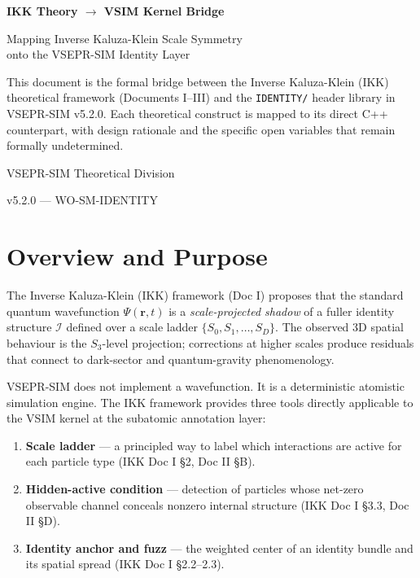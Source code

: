 \documentclass[11pt, a4paper, oneside]{article}
\newcommand{\Id}{\mathcal{I}}
\theoremstyle{definition}
\theoremstyle{remark}
\begin{document}
\begin{titlepage}
  \centering
  \vspace*{1.5cm}
  {\Huge\bfseries IKK Theory $\to$ VSIM Kernel Bridge\par}
  \vspace{0.8cm}
  {\Large Mapping Inverse Kaluza-Klein Scale Symmetry\\[0.3em]
  onto the VSEPR-SIM Identity Layer\par}
  \vspace{1.5cm}
  {\normalsize
	This document is the formal bridge between the Inverse Kaluza-Klein (IKK)
	theoretical framework (Documents I--III) and the \texttt{IDENTITY/} header
	library in VSEPR-SIM v5.2.0.  Each theoretical construct is mapped to its
	direct C++ counterpart, with design rationale and the specific open variables
	that remain formally undetermined.
  \par}
  \vspace{1.5cm}
  {\large VSEPR-SIM Theoretical Division\par}
  \vspace{0.3cm}
  {\large v5.2.0 --- WO-SM-IDENTITY\par}
\end{titlepage}

\tableofcontents
\newpage

\section{Overview and Purpose}

The Inverse Kaluza-Klein (IKK) framework (Doc I) proposes that the standard
quantum wavefunction $\Psi(\mathbf{r}, t)$ is a \emph{scale-projected shadow}
of a fuller identity structure $\Id$ defined over a scale ladder
$\{S_0, S_1, \ldots, S_D\}$.  The observed 3D spatial behaviour is the
$S_3$-level projection; corrections at higher scales produce residuals that
connect to dark-sector and quantum-gravity phenomenology.

VSEPR-SIM does not implement a wavefunction.  It is a deterministic atomistic
simulation engine.  The IKK framework provides three tools directly applicable
to the VSIM kernel at the subatomic annotation layer:

\begin{enumerate}
  \item \textbf{Scale ladder} --- a principled way to label which interactions
	are active for each particle type (IKK Doc I \S2, Doc II \S B).
  \item \textbf{Hidden-active condition} --- detection of particles whose
	net-zero observable channel conceals nonzero internal structure
	(IKK Doc I \S3.3, Doc II \S D).
  \item \textbf{Identity anchor and fuzz} --- the weighted center of an
	identity bundle and its spatial spread (IKK Doc I \S2.2--2.3).
\end{enumerate}
\end{document}
